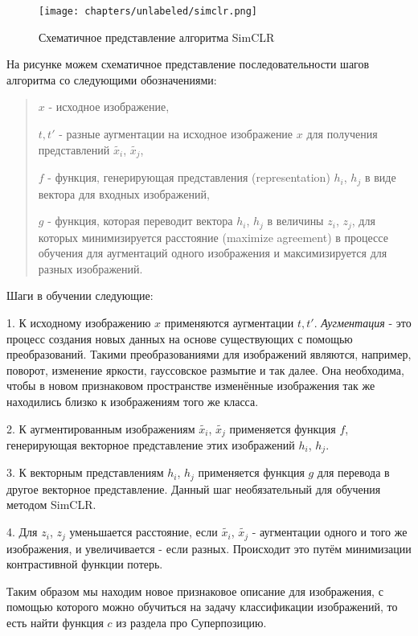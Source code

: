 \begin{figure}
    \centering
    \texttt{[image: chapters/unlabeled/simclr.png]}
    \caption{Схематичное представление алгоритма SimCLR}
    \label{fig:enter-label-1}
\end{figure}

На рисунке можем схематичное представление последовательности шагов алгоритма со следующими обозначениями:

\begin{quote}
$x$ - исходное изображение,

$t, t'$ - разные аугментации на исходное изображение $x$ для получения представлений $\tilde{x_i}$, $\tilde{x_j}$,

$f$ - функция, генерирующая представления (representation) $h_i$, $h_j$ в виде вектора для входных изображений,

$g$ - функция, которая переводит вектора $h_i$, $h_j$ в величины $z_i$, $z_j$, для которых минимизируется расстояние (maximize agreement) в процессе обучения для аугментаций одного изображения и максимизируется для разных изображений.
\end{quote}

Шаги в обучении следующие:

1. К исходному изображению $x$ применяются аугментации $t, t'$. \textit{Аугментация} - это процесс создания новых данных на основе существующих с помощью преобразований. Такими преобразованиями для изображений являются, например, поворот, изменение яркости, гауссовское размытие и так далее. Она необходима, чтобы в новом признаковом пространстве изменённые изображения так же находились близко к изображениям того же класса.

2. К аугментированным изображениям $\tilde{x_i}$, $\tilde{x_j}$ применяется функция $f$, генерирующая векторное представление этих изображений $h_i$, $h_j$.

3. К векторным представлениям $h_i$, $h_j$ применяется функция $g$ для перевода в другое векторное представление. Данный шаг необязательный для обучения методом SimCLR.

4. Для $z_i$, $z_j$ уменьшается расстояние, если $\tilde{x_i}$, $\tilde{x_j}$ - аугментации одного и того же изображения, и увеличивается - если разных. Происходит это путём минимизации контрастивной функции потерь. 

Таким образом мы находим новое признаковое описание для изображения, с помощью которого можно обучиться на задачу классификации изображений, то есть найти функция $c$ из раздела про Суперпозицию.

